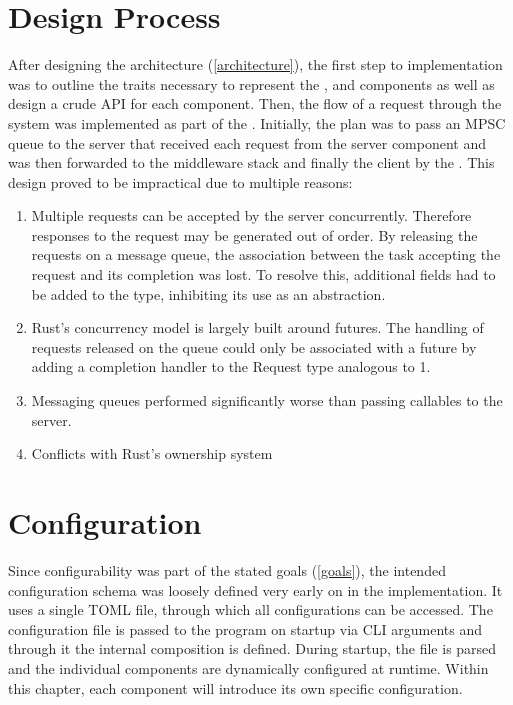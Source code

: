 \section{Design Process}

After designing the architecture (\ref{architecture}), the first step to implementation was to outline the traits necessary to represent the ,  and  components as well as design a crude API for each component. Then, the flow of a request through the system was implemented as part of the . Initially, the plan was to pass an MPSC queue to the server that received each request from the server component and was then forwarded to the middleware stack and finally the client by the . This design proved to be impractical due to multiple reasons:
\begin{enumerate}
	\item Multiple requests can be accepted by the server concurrently. Therefore responses to the request may be generated out of order. By releasing the requests on a message queue, the association between the task accepting the request and its completion was lost. To resolve this, additional fields had to be added to the  type, inhibiting its use as an abstraction.
	\item Rust's concurrency model is largely built around futures. The handling of requests released on the queue could only be associated with a future by adding a completion handler to the Request type analogous to 1.
	\item Messaging queues performed significantly worse than passing callables to the server.
	\item Conflicts with Rust's ownership system
\end{enumerate}


\section{Configuration}
\label{configuration}

Since configurability was part of the stated goals (\ref{goals}), the intended configuration schema was loosely defined very early on in the implementation. It uses a single TOML file, through which all configurations can be accessed. The configuration file is passed to the program on startup via CLI arguments and through it the internal composition is defined. During startup, the file is parsed and the individual components are dynamically configured at runtime. Within this chapter, each component will introduce its own specific configuration.

